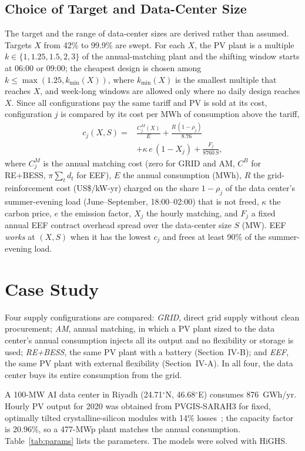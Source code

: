 \documentclass[conference]{IEEEtran}
\begin{document}
\subsection{Choice of Target and Data-Center Size}
The target and the range of data-center sizes are derived rather than assumed. Targets $X$ from 42\% to 99.9\% are swept. For each $X$, the PV plant is a multiple $k\in\{1,1.25,1.5,2,3\}$ of the annual-matching plant and the shifting window starts at 06:00 or 09:00; the cheapest design is chosen among $k\le\max(1.25,k_{\min}(X))$, where $k_{\min}(X)$ is the smallest multiple that reaches $X$, and week-long windows are allowed only where no daily design reaches $X$. Since all configurations pay the same tariff and PV is sold at its cost, configuration $j$ is compared by its cost per MWh of consumption above the tariff,
\begin{align}
c_j(X,S)={}&\frac{C^M_j(X)}{E}+\frac{R\,(1-\rho_j)}{8.76}\nonumber\\
&+\kappa\,e\,(1-X_j)+\frac{F_j}{8760\,S},
\label{eq:unitcost}
\end{align}
where $C^M_j$ is the annual matching cost (zero for GRID and AM, $C^B$ for RE+BESS, $\pi\sum_t d_t$ for EEF), $E$ the annual consumption (MWh), $R$ the grid-reinforcement cost (US\$/kW-yr) charged on the share $1-\rho_j$ of the data center's summer-evening load (June--September, 18:00--02:00) that is not freed, $\kappa$ the carbon price, $e$ the emission factor, $X_j$ the hourly matching, and $F_j$ a fixed annual EEF contract overhead spread over the data-center size $S$ (MW). EEF \emph{works} at $(X,S)$ when it has the lowest $c_j$ and frees at least 90\% of the summer-evening load.

\section{Case Study}
Four supply configurations are compared: \emph{GRID}, direct grid supply without clean procurement; \emph{AM}, annual matching, in which a PV plant sized to the data center's annual consumption injects all its output and no flexibility or storage is used; \emph{RE+BESS}, the same PV plant with a battery (Section~IV-B); and \emph{EEF}, the same PV plant with external flexibility (Section~IV-A). In all four, the data center buys its entire consumption from the grid.

A 100-MW AI data center in Riyadh (24.71$^\circ$N, 46.68$^\circ$E) consumes 876~GWh/yr. Hourly PV output for 2020 was obtained from PVGIS-SARAH3 for fixed, optimally tilted crystalline-silicon modules with 14\% losses~\cite{pvgis}; the capacity factor is 20.96\%, so a 477-MWp plant matches the annual consumption. Table~\ref{tab:params} lists the parameters. The models were solved with HiGHS.
\end{document}
